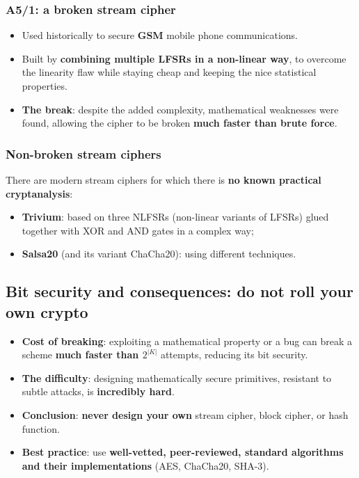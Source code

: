 \subsubsection{A5/1: a broken stream cipher}

\begin{itemize}
    \item Used historically to secure \textbf{GSM} mobile phone communications.
    \item Built by \textbf{combining multiple LFSRs in a non-linear way}, to overcome the linearity flaw while staying cheap and keeping the nice statistical properties.
    \item \textbf{The break}: despite the added complexity, mathematical weaknesses were found, allowing the cipher to be broken \textbf{much faster than brute force}.
\end{itemize}

\subsubsection{Non-broken stream ciphers}

There are modern stream ciphers for which there is \textbf{no known practical cryptanalysis}:
\begin{itemize}
    \item \textbf{Trivium}: based on three NLFSRs (non-linear variants of LFSRs) glued together with XOR and AND gates in a complex way;
    \item \textbf{Salsa20} (and its variant ChaCha20): using different techniques.
\end{itemize}

\subsection{Bit security and consequences: do not roll your own crypto}

\begin{itemize}
    \item \textbf{Cost of breaking}: exploiting a mathematical property or a bug can break a scheme \textbf{much faster than $2^{|K|}$} attempts, reducing its bit security.
    \item \textbf{The difficulty}: designing mathematically secure primitives, resistant to subtle attacks, is \textbf{incredibly hard}.
    \item \textbf{Conclusion}: \textbf{never design your own} stream cipher, block cipher, or hash function.
    \item \textbf{Best practice}: use \textbf{well-vetted, peer-reviewed, standard algorithms and their implementations} (AES, ChaCha20, SHA-3).
\end{itemize}

